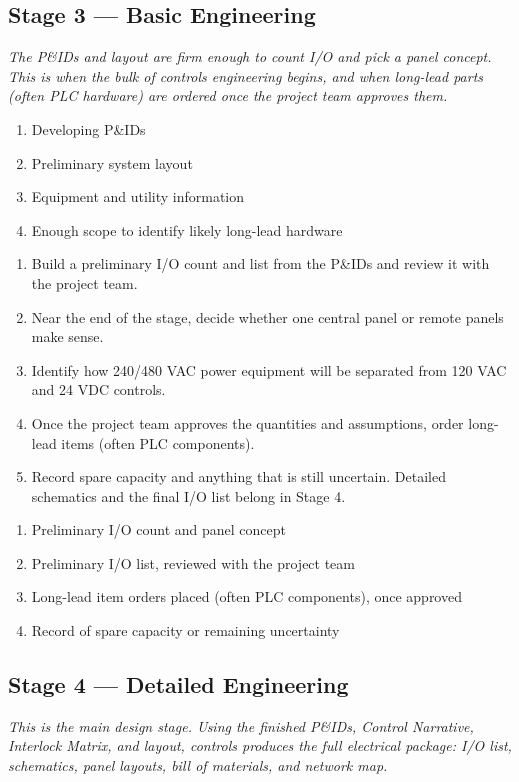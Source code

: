 \subsection{Stage 3 --- Basic Engineering}
\textit{The P\&IDs and layout are firm enough to count I/O and pick a panel concept. This is when the bulk of controls engineering begins, and when long-lead parts (often PLC hardware) are ordered once the project team approves them.}

\begin{enumerate}[itemsep=1pt]
  \item Developing P\&IDs
  \item Preliminary system layout
  \item Equipment and utility information
  \item Enough scope to identify likely long-lead hardware
\end{enumerate}

\begin{enumerate}[itemsep=1pt]
  \item Build a preliminary I/O count and list from the P\&IDs and review it with the project team.
  \item Near the end of the stage, decide whether one central panel or remote panels make sense.
  \item Identify how 240/480 VAC power equipment will be separated from 120 VAC and 24 VDC controls.
  \item Once the project team approves the quantities and assumptions, order long-lead items (often PLC components).
  \item Record spare capacity and anything that is still uncertain. Detailed schematics and the final I/O list belong in Stage 4.
\end{enumerate}

\begin{enumerate}[itemsep=1pt]
  \item Preliminary I/O count and panel concept
  \item Preliminary I/O list, reviewed with the project team
  \item Long-lead item orders placed (often PLC components), once approved
  \item Record of spare capacity or remaining uncertainty
\end{enumerate}

\subsection{Stage 4 --- Detailed Engineering}\label{sec:stage4}
\textit{This is the main design stage. Using the finished P\&IDs, Control Narrative, Interlock Matrix, and layout, controls produces the full electrical package: I/O list, schematics, panel layouts, bill of materials, and network map.}

